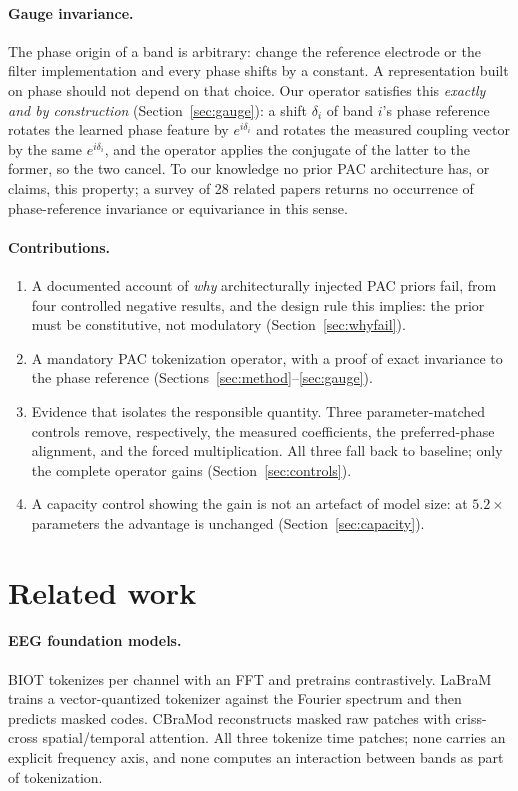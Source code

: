 \documentclass{article}
\begin{document}
\paragraph{Gauge invariance.}
The phase origin of a band is arbitrary: change the reference electrode or the
filter implementation and every phase shifts by a constant. A representation
built on phase should not depend on that choice. Our operator satisfies this
\emph{exactly and by construction} (Section~\ref{sec:gauge}): a shift $\delta_i$
of band $i$'s phase reference rotates the learned phase feature by
$e^{i\delta_i}$ and rotates the measured coupling vector by the same
$e^{i\delta_i}$, and the operator applies the conjugate of the latter to the
former, so the two cancel. To our knowledge no prior PAC architecture has, or
claims, this property; a survey of 28 related papers returns no occurrence of
phase-reference invariance or equivariance in this sense.

\paragraph{Contributions.}
\begin{enumerate}
\item A documented account of \emph{why} architecturally injected PAC priors
fail, from four controlled negative results, and the design rule this implies:
the prior must be constitutive, not modulatory (Section~\ref{sec:whyfail}).
\item A mandatory PAC tokenization operator, with a proof of exact invariance to
the phase reference (Sections~\ref{sec:method}--\ref{sec:gauge}).
\item Evidence that isolates the responsible quantity. Three parameter-matched
controls remove, respectively, the measured coefficients, the preferred-phase
alignment, and the forced multiplication. All three fall back to baseline; only
the complete operator gains (Section~\ref{sec:controls}).
\item A capacity control showing the gain is not an artefact of model size: at
$5.2\times$ parameters the advantage is unchanged (Section~\ref{sec:capacity}).
\end{enumerate}

\section{Related work}

\paragraph{EEG foundation models.}
BIOT \citep{yang2023biot} tokenizes per channel with an FFT and pretrains
contrastively. LaBraM \citep{jiang2024labram} trains a vector-quantized tokenizer
against the Fourier spectrum and then predicts masked codes. CBraMod
\citep{wang2025cbramod} reconstructs masked raw patches with criss-cross
spatial/temporal attention. All three tokenize time patches; none carries an
explicit frequency axis, and none computes an interaction between bands as part
of tokenization.
\end{document}
